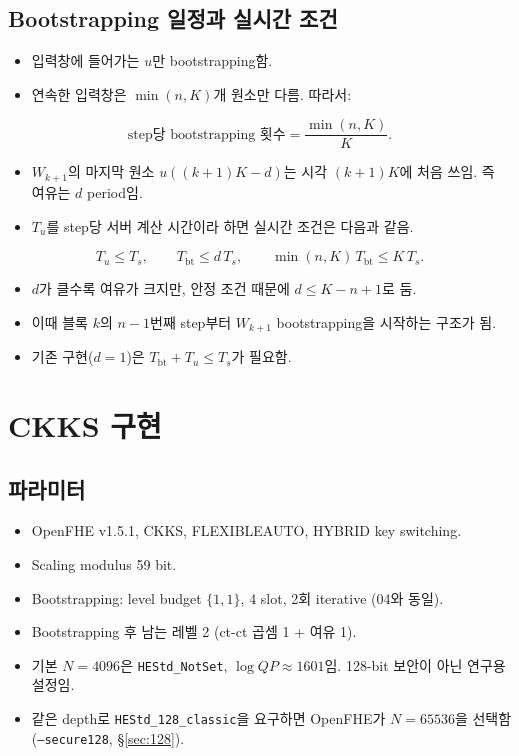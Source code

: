 \documentclass[11pt,a4paper]{article}
\begin{document}
\subsection{Bootstrapping 일정과 실시간 조건}
\begin{itemize}
\item 입력창에 들어가는 $u$만 bootstrapping함.
\item 연속한 입력창은 $\min(n,K)$개 원소만 다름. 따라서:
\end{itemize}
\begin{equation}
\text{step당 bootstrapping 횟수}=\frac{\min(n,K)}{K}.
\end{equation}
\begin{itemize}
\item $W_{k+1}$의 마지막 원소 $u((k+1)K-d)$는 시각 $(k+1)K$에 처음 쓰임. 즉 여유는 $d$ period임.
\item $T_u$를 step당 서버 계산 시간이라 하면 실시간 조건은 다음과 같음.
\end{itemize}
\begin{equation}
T_u\le T_s,\qquad T_{\mathrm{bt}}\le d\,T_s,\qquad \min(n,K)\,T_{\mathrm{bt}}\le K\,T_s .
\label{eq:rt}
\end{equation}
\begin{itemize}
\item $d$가 클수록 여유가 크지만, 안정 조건 때문에 $d\le K-n+1$로 둠.
\item 이때 블록 $k$의 $n-1$번째 step부터 $W_{k+1}$ bootstrapping을 시작하는 구조가 됨.
\item 기존 구현($d=1$)은 $T_{\mathrm{bt}}+T_u\le T_s$가 필요함.
\end{itemize}

\section{CKKS 구현}

\subsection{파라미터}
\begin{itemize}
\item OpenFHE v1.5.1, CKKS, FLEXIBLEAUTO, HYBRID key switching.
\item Scaling modulus 59 bit.
\item Bootstrapping: level budget $\{1,1\}$, 4 slot, 2회 iterative (04와 동일).
\item Bootstrapping 후 남는 레벨 2 (ct-ct 곱셈 1 + 여유 1).
\item 기본 $N=4096$은 \texttt{HEStd\_NotSet}, $\log QP\approx1601$임. 128-bit 보안이 아닌 연구용 설정임.
\item 같은 depth로 \texttt{HEStd\_128\_classic}을 요구하면 OpenFHE가 $N=65536$을 선택함 (\texttt{--secure128}, \S\ref{sec:128}).
\end{itemize}
\end{document}

